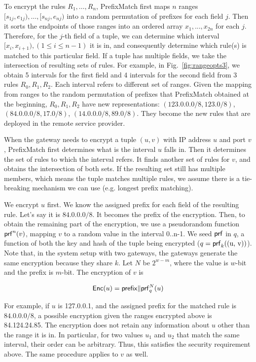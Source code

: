 To encrypt the rules $R_1, \dots, R_n$, PrefixMatch first maps $n$ ranges $[s_{1j}, e_{1j}), \dots, [s_{nj}, e_{nj})$ into a random permutation of prefixes for each field $j$. Then it sorts the endpoints of those ranges into an ordered array $x_1, ..., x_{2n}$ for each $j$. Therefore, for the $j$-th field of a tuple, we can determine which interval $[x_i, x_{i+1}), (1 \leq i \leq n-1)$ it is in, and consequently determine which rule(s) is matched to this particular field. If a tuple has multiple fields, we take the intersection of resulting sets of rules. For example, in Fig.~\ref{fig:rangeopts3}, we obtain 5 intervals for the first field and 4 intervals for the second field from 3 rules $R_0, R_1, R_2$. Each interval refers to different set of ranges. Given the mapping from ranges to the random permutation of prefixes that PrefixMatch obtained at the beginning, $R_0, R_1, R_2$ have new representations: $(123.0.0.0/8, 123.0/8)$, $(84.0.0.0/8, 17.0/8)$, $(14.0.0.0/8, 89.0/8)$. They become the new rules that are deployed in the remote service provider.

When the gateway needs to encrypt a tuple $(u, v)$ with IP address $u$ and port $v$, PrefixMatch first determines what is the interval $u$ falls in. Then it determines the set of rules to which the interval refers. It finds another set of rules for $v$, and obtains the intersection of both sets. If the resulting set still has multiple members, which means the tuple matches multiple rules, we assume there is a tie-breaking mechanism we can use (e.g. longest prefix matching). 

We encrypt $u$ first. We know the assigned prefix for each field of the resulting rule. Let's say it is $84.0.0.0/8$. It becomes the prefix of the encryption. Then, to obtain the remaining part of the encryption, we use a pseudorandom function $\mathsf{prf}^n(v)$, mapping $v$ to a random value in the interval 0..n-1. We seed $\mathsf{prf}$ in $q$, a function of both the key and hash of the tuple being encrypted ($q = \mathsf{prf}_k(\text{(u, v)})$). Note that, in the system setup with two gateways, the gateways generate the same encryption because they share $k$. Let $N$ be $2^{w-m}$, where the value is $w$-bit and the prefix is $m$-bit. The encryption of $v$ is

\begin{equation}
\mathsf{Enc}(u) = \mathsf{prefix} \Vert \mathsf{prf}_q^N(u)
\end{equation}

For example, if $u$ is 127.0.0.1, and the assigned prefix for the matched rule is $84.0.0.0/8$, a possible encryption given the ranges encrypted above is 84.124.24.85. The encryption does not retain any information about $u$ other than the range it is in. In particular, for two values $u_1$ and $u_2$ that match the same interval, their order can be arbitrary. Thus, this satisfies the security requirement above. The same procedure applies to $v$ as well.

